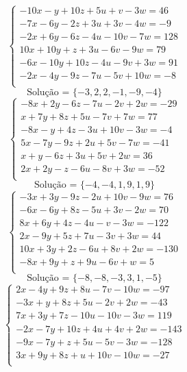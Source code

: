 \documentclass[12pt,oneside,a4paper]{article}
\begin{document}
\vspace{\baselineskip}
\begin{equation*}
\begin{cases}
-10x-y+10z+5u+v-3w=46 \\
-7x-6y-2z+3u+3v-4w=-9 \\
-2x+6y-6z-4u-10v-7w=128 \\
10x+10y+z+3u-6v-9w=79 \\
-6x-10y+10z-4u-9v+3w=91 \\
-2x-4y-9z-7u-5v+10w=-8 \\
\end{cases}
\end{equation*}
\begin{equation*}
\text{Solução = }\{-3,2,2,-1,-9,-4\}
\end{equation*}
\vspace{\baselineskip}
\begin{equation*}
\begin{cases}
-8x+2y-6z-7u-2v+2w=-29 \\
x+7y+8z+5u-7v+7w=77 \\
-8x-y+4z-3u+10v-3w=-4 \\
5x-7y-9z+2u+5v-7w=-41 \\
x+y-6z+3u+5v+2w=36 \\
2x+2y-z-6u-8v+3w=-52 \\
\end{cases}
\end{equation*}
\begin{equation*}
\text{Solução = }\{-4,-4,1,9,1,9\}
\end{equation*}
\vspace{\baselineskip}
\begin{equation*}
\begin{cases}
-3x+3y-9z-2u+10v-9w=76 \\
-6x-6y+8z-5u+3v-2w=70 \\
8x+6y+4z-4u-v-3w=-122 \\
2x-9y+5z+7u-3v+3w=44 \\
10x+3y+2z-6u+8v+2w=-130 \\
-8x+9y+z+9u-6v+w=5 \\
\end{cases}
\end{equation*}
\begin{equation*}
\text{Solução = }\{-8,-8,-3,3,1,-5\}
\end{equation*}
\vspace{\baselineskip}
\begin{equation*}
\begin{cases}
2x-4y+9z+8u-7v-10w=-97 \\
-3x+y+8z+5u-2v+2w=-43 \\
7x+3y+7z-10u-10v-3w=119 \\
-2x-7y+10z+4u+4v+2w=-143 \\
-9x-7y+z+5u-5v-3w=-128 \\
3x+9y+8z+u+10v-10w=-27 \\
\end{cases}
\end{equation*}
\end{document}
